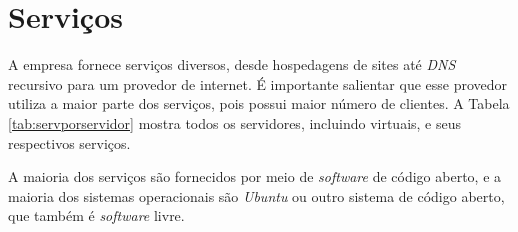 \section{Serviços}
\label{section:serv}

A empresa fornece serviços diversos, desde hospedagens de sites até \textit{DNS} recursivo para um provedor de internet. É importante
salientar que esse provedor utiliza a maior parte dos serviços, pois possui maior número de clientes.
A Tabela \ref{tab:servporservidor} mostra todos os servidores, incluindo virtuais, e seus respectivos serviços.

A maioria dos serviços são fornecidos por meio de \textit{software} de código aberto, e a maioria dos sistemas operacionais são \textit{Ubuntu}
ou outro sistema de código aberto, que também é \textit{software} livre.

